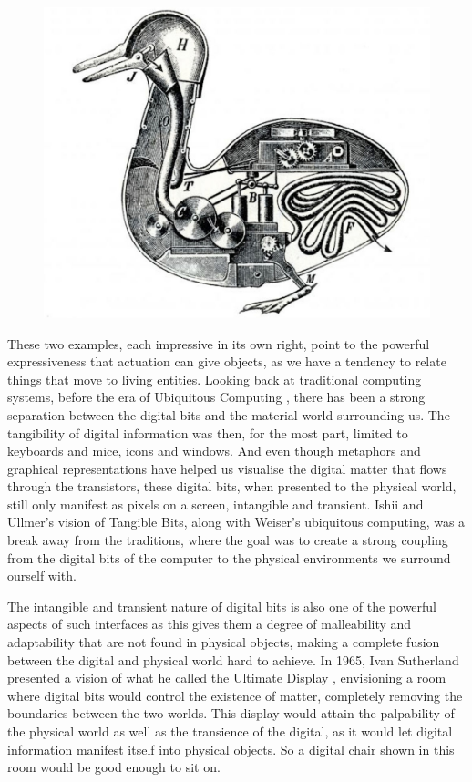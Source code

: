\begin{figure}[h]
	\centering
	\begin{minipage}[b]{.8\textwidth}
		\centering
		\includegraphics[width=.7\linewidth]{figures/vaucanson_duck}
		\label{vaucanson_duck}
	\end{minipage}
\end{figure}

These two examples, each impressive in its own right, point to the powerful expressiveness that actuation can give objects, as we have a tendency to relate things that move to living entities. 
\blank  
Looking back at traditional computing systems, before the era of Ubiquitous Computing \citep{weiser1991computer}, there has been a strong separation between the digital bits and the material world surrounding us.
The tangibility of digital information was then, for the most part, limited to keyboards and mice, icons and windows. 
And even though metaphors and graphical representations have helped us visualise the digital matter that flows through the transistors, these digital bits, when presented to the physical world, still only manifest as pixels on a screen, intangible and transient. 
Ishii and Ullmer's \citep{ishii1997tangible} vision of Tangible Bits, along with Weiser's ubiquitous computing, was a break away from the traditions, where the goal was to create a strong coupling from the digital bits of the computer to the physical environments we surround ourself with.

The intangible and transient nature of digital bits is also one of the powerful aspects of such interfaces as this gives them a degree of malleability and adaptability that are not found in physical objects, making a complete fusion between the digital and physical world hard to achieve.
\blank
In 1965, Ivan Sutherland presented a vision of what he called the Ultimate Display \citep{sutherland1965ultimate}, envisioning a room where digital bits would control the existence of matter, completely removing the boundaries between the two worlds.
This display would attain the palpability of the physical world as well as the transience of the digital, as it would let digital information manifest itself into physical objects.
So a digital chair shown in this room would be good enough to sit on.

